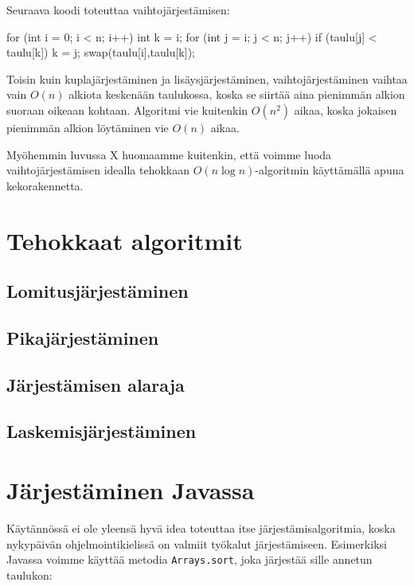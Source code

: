 Seuraava koodi toteuttaa vaihtojärjestämisen:

\begin{code}
for (int i = 0; i < n; i++) {
    int k = i;
    for (int j = i; j < n; j++) {
        if (taulu[j] < taulu[k]) k = j;
    }
    swap(taulu[i],taulu[k]);
}
\end{code}

Toisin kuin kuplajärjestäminen ja lisäysjärjestäminen,
vaihtojärjestäminen vaihtaa vain $O(n)$ alkiota keskenään
taulukossa, koska se siirtää aina pienimmän alkion
suoraan oikeaan kohtaan.
Algoritmi vie kuitenkin $O(n^2)$ aikaa,
koska jokaisen pienimmän alkion löytäminen vie $O(n)$ aikaa.

Myöhemmin luvussa X huomaamme kuitenkin,
että voimme luoda vaihtojärjestämisen idealla tehokkaan
$O(n \log n)$-algoritmin käyttämällä apuna kekorakennetta.

\section{Tehokkaat algoritmit}

\subsection{Lomitusjärjestäminen}

\subsection{Pikajärjestäminen}

\subsection{Järjestämisen alaraja}

\subsection{Laskemisjärjestäminen}

\section{Järjestäminen Javassa}

Käytännössä ei ole yleensä hyvä idea toteuttaa itse
järjestämisalgoritmia, koska nykypäivän ohjelmointikielissä
on valmiit työkalut järjestämiseen.
Esimerkiksi Javassa voimme käyttää metodia \texttt{Arrays.sort},
joka järjestää sille annetun taulukon:


